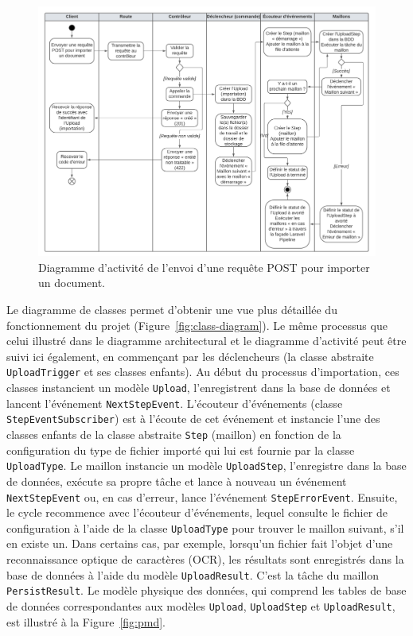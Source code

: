 \begin{figure}
    \centering
    \includegraphics[width=\textwidth]{img/import-activity-diagram}
    \caption{Diagramme d'activité de l'envoi d'une requête POST pour importer un document.}
    \label{fig:import-activity-diagram}
\end{figure}

Le diagramme de classes permet d'obtenir une vue plus détaillée du fonctionnement du projet (Figure~\ref{fig:class-diagram}). Le même processus que celui illustré dans le diagramme architectural et le diagramme d'activité peut être suivi ici également, en commençant par les déclencheurs (la classe abstraite \Verb|UploadTrigger| et ses classes enfants). Au début du processus d'importation, ces classes instancient un modèle \Verb|Upload|, l'enregistrent dans la base de données et lancent l'événement \Verb|NextStepEvent|. L'écouteur d'événements (classe \Verb|StepEventSubscriber|) est à l'écoute de cet événement et instancie l'une des classes enfants de la classe abstraite \Verb|Step| (maillon) en fonction de la configuration du type de fichier importé qui lui est fournie par la classe \Verb|UploadType|. Le maillon instancie un modèle \Verb|UploadStep|, l'enregistre dans la base de données, exécute sa propre tâche et lance à nouveau un événement \Verb|NextStepEvent| ou, en cas d'erreur, lance l'événement \Verb|StepErrorEvent|. Ensuite, le cycle recommence avec l'écouteur d'événements, lequel consulte le fichier de configuration à l'aide de la classe \Verb|UploadType| pour trouver le maillon suivant, s'il en existe un. Dans certains cas, par exemple, lorsqu'un fichier fait l'objet d'une reconnaissance optique de caractères (OCR), les résultats sont enregistrés dans la base de données à l'aide du modèle \Verb|UploadResult|. C'est la tâche du maillon \Verb|PersistResult|. Le modèle physique des données, qui comprend les tables de base de données correspondantes aux modèles \Verb|Upload|, \Verb|UploadStep| et \Verb|UploadResult|, est illustré à la Figure~\ref{fig:pmd}.

